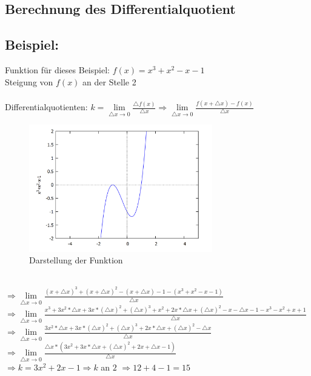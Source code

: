 \documentclass[../mainfile.tex]{subfiles}
\begin{document}
	\subsection{Berechnung des Differentialquotient}
	\subsection*{Beispiel:}
	Funktion für dieses Beispiel: $f(x) = x^{3} + x^{2} - x - 1$\\
	Steigung von $f(x)$ an der Stelle 2\\
\quad\\
	Differentialquotienten: $k = \lim\limits_{\triangle x \rightarrow 0}{\frac{\triangle f(x)}{\triangle x}} \Rightarrow \lim\limits_{\triangle x \rightarrow 0}{\frac{f(x+\triangle x)-f(x)}{\triangle x}}$
	\FloatBarrier
	\begin{figure}[h] 
		\centering
		\includegraphics[width=8cm]{./swahl/img/graph2.jpg}
		\caption{Darstellung der Funktion}
	\end{figure}
	\FloatBarrier
\quad\\
	$\Rightarrow \lim\limits_{\triangle x \rightarrow 0}{\frac{(x+ \triangle x)^{3} + (x + \triangle x)^{2} - (x+ \triangle x) - 1 - (x^{3} + x^{2} - x - 1)}{\triangle x}}$\\
	$\Rightarrow \lim\limits_{\triangle x \rightarrow 0}{\frac{x^{3}+3x^{2}*\triangle x + 3x*(\triangle x)^{2} + (\triangle x)^{3}+ x^{2} + 2x*\triangle x + (\triangle x)^{2} - x - \triangle x -1 -x^{3} - x^{2} + x + 1 }{\triangle x}}$\\
$\Rightarrow \lim\limits_{\triangle x \rightarrow 0}{\frac{3x^{2} * \triangle x + 3x * (\triangle x)^{2} + (\triangle x)^{3} + 2x * \triangle x + (\triangle x)^{2} - \triangle x}{\triangle x}}$\\
$\Rightarrow \lim\limits_{\triangle x \rightarrow 0}{\frac{\triangle x * (3x^{2} + 3x * \triangle x + (\triangle x)^{2} + 2x+ \triangle x - 1) }{\triangle x}}$\\
$\Rightarrow k = 3x^{2} + 2x - 1 \Rightarrow k$ an $2$ $\Rightarrow 12 + 4 - 1 = 15$
\end{document}
